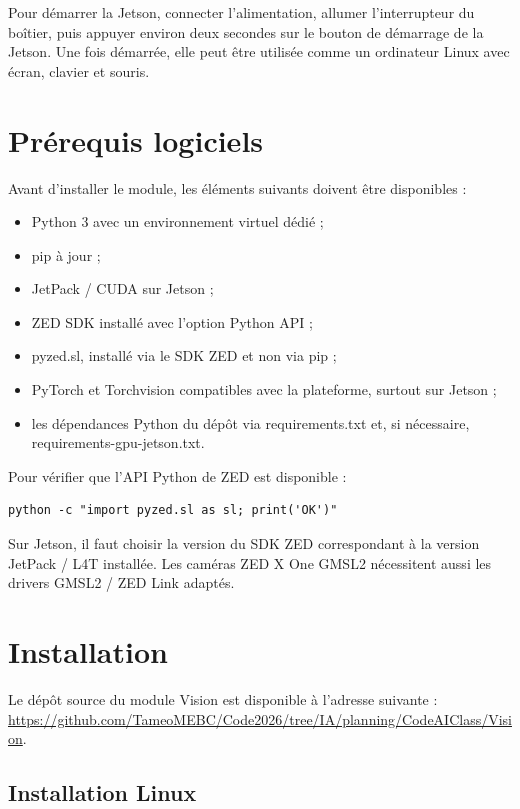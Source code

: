 \documentclass[11pt,letterpaper]{article}
\begin{document}
Pour démarrer la Jetson, connecter l’alimentation, allumer l’interrupteur du boîtier, puis appuyer environ deux secondes sur le bouton de démarrage de la Jetson. Une fois démarrée, elle peut être utilisée comme un ordinateur Linux avec écran, clavier et souris.

\section{Prérequis logiciels}

Avant d’installer le module, les éléments suivants doivent être disponibles :

\begin{itemize}
    \item Python 3 avec un environnement virtuel dédié ;
    \item pip à jour ;
    \item JetPack / CUDA sur Jetson ;
    \item ZED SDK installé avec l’option Python API ;
    \item pyzed.sl, installé via le SDK ZED et non via pip ;
    \item PyTorch et Torchvision compatibles avec la plateforme, surtout sur Jetson ;
    \item les dépendances Python du dépôt via requirements.txt et, si nécessaire, requirements-gpu-jetson.txt.
\end{itemize}

Pour vérifier que l’API Python de ZED est disponible :

\begin{verbatim}
python -c "import pyzed.sl as sl; print('OK')"
\end{verbatim}

Sur Jetson, il faut choisir la version du SDK ZED correspondant à la version JetPack / L4T installée. Les caméras ZED X One GMSL2 nécessitent aussi les drivers GMSL2 / ZED Link adaptés.

\section{Installation}

Le dépôt source du module Vision est disponible à l’adresse suivante : \url{https://github.com/TameoMEBC/Code2026/tree/IA/planning/CodeAIClass/Vision}.

\subsection{Installation Linux}
\end{document}

